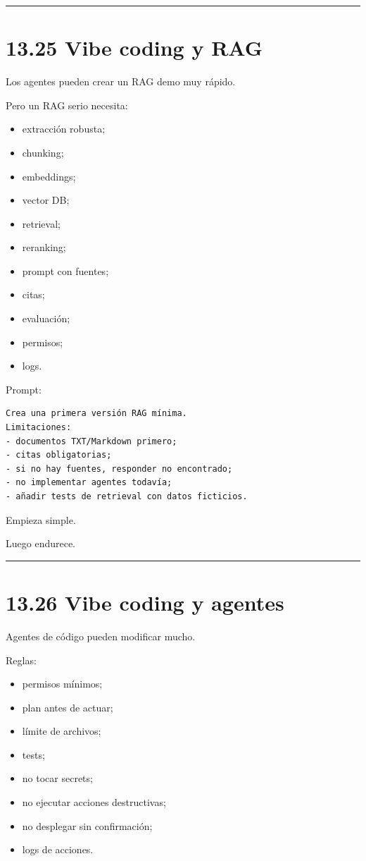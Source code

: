 \begin{center}\rule{0.5\linewidth}{0.5pt}\end{center}

\section{13.25 Vibe coding y RAG}\label{vibe-coding-y-rag}

Los agentes pueden crear un RAG demo muy rápido.

Pero un RAG serio necesita:

\begin{itemize}
\tightlist
\item
  extracción robusta;
\item
  chunking;
\item
  embeddings;
\item
  vector DB;
\item
  retrieval;
\item
  reranking;
\item
  prompt con fuentes;
\item
  citas;
\item
  evaluación;
\item
  permisos;
\item
  logs.
\end{itemize}

Prompt:

\begin{lstlisting}
Crea una primera versión RAG mínima.
Limitaciones:
- documentos TXT/Markdown primero;
- citas obligatorias;
- si no hay fuentes, responder no encontrado;
- no implementar agentes todavía;
- añadir tests de retrieval con datos ficticios.
\end{lstlisting}

Empieza simple.

Luego endurece.

\begin{center}\rule{0.5\linewidth}{0.5pt}\end{center}

\section{13.26 Vibe coding y agentes}\label{vibe-coding-y-agentes}

Agentes de código pueden modificar mucho.

Reglas:

\begin{itemize}
\tightlist
\item
  permisos mínimos;
\item
  plan antes de actuar;
\item
  límite de archivos;
\item
  tests;
\item
  no tocar secrets;
\item
  no ejecutar acciones destructivas;
\item
  no desplegar sin confirmación;
\item
  logs de acciones.
\end{itemize}

